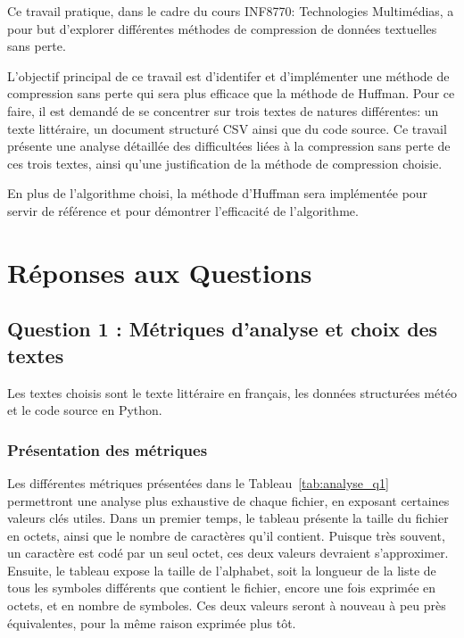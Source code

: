\documentclass[12pt,letterpaper]{article}
\begin{document}
Ce travail pratique, dans le cadre du cours INF8770: Technologies Multimédias, a pour but d'explorer différentes méthodes de compression de données textuelles sans perte.

L'objectif principal de ce travail est d'identifer et d'implémenter une méthode de compression sans perte qui sera plus efficace que la méthode de Huffman.
Pour ce faire, il est demandé de se concentrer sur trois textes de natures différentes: un texte littéraire, un document structuré CSV ainsi que du code source.
Ce travail présente une analyse détaillée des difficultées liées à la compression sans perte de ces trois textes, ainsi qu'une justification de la méthode de compression choisie.

En plus de l'algorithme choisi, la méthode d'Huffman sera implémentée pour servir de référence et pour démontrer l'efficacité de l'algorithme.


\section{Réponses aux Questions}
\label{sec:reponses}

\subsection{Question 1 : Métriques d'analyse et choix des textes}
\label{subsec:q1}

Les textes choisis sont le texte littéraire en français, les données structurées météo et le code source en Python.

\subsubsection*{Présentation des métriques}

Les différentes métriques présentées dans le Tableau~\ref{tab:analyse_q1} permettront une analyse plus exhaustive de chaque fichier, en exposant certaines valeurs clés utiles.
Dans un premier temps, le tableau présente la taille du fichier en octets, ainsi que le nombre de caractères qu'il contient.
Puisque très souvent, un caractère est codé par un seul octet, ces deux valeurs devraient s'approximer.
Ensuite, le tableau expose la taille de l'alphabet, soit la longueur de la liste de tous les symboles différents que contient le fichier, encore une fois exprimée en octets, et en nombre de symboles.
Ces deux valeurs seront à nouveau à peu près équivalentes, pour la même raison exprimée plus tôt.
\end{document}
